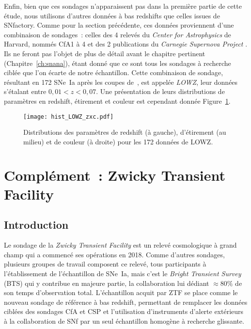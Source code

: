 \documentclass[../main/main.tex]{subfiles}
\begin{document}
Enfin, bien que ces sondages n'apparaissent pas dans la première partie de cette
étude, nous utilisons d'autres données à bas redshifts que celles issues de
SNfactory. Comme pour la section précédente, ces données proviennent d'une
combinaison de sondages~: celles des 4 relevés du \textit{Center for
Astrophysics} de Harvard, nommés CfA1 à 4 \citep{riess1999, jha2006,
hicken2009a, hicken2009b, hicken2012} et des 2 publications du \textit{Carnegie
Supernova Project} \citep[CSP,][]{contreras2010, folatelli2010,
stritzinger2011}. Ils ne feront pas l'objet de plus de détail avant le chapitre
pertinent (Chapitre~\ref{ch:snana}), étant donné que ce sont tous les sondages à
recherche ciblée que l'on écarte de notre échantillon. Cette combinaison de
sondage, résultant en 172 SNe~Ia après les coupes de~\cite{scolnic2018}, est
appelée \textit{LOWZ}, leur données s'étalant entre $0,01 < z < 0,07$. Une
présentation de leurs distributions de paramètres en redshift, étirement et
couleur est cependant donnée Figure~\ref{fig:lowzhist}.

\begin{figure}[ht]
    \centering
    \texttt{[image: hist\_LOWZ\_zxc.pdf]}
    \caption[Distributions des paramètres de redshift, étirement et couleur de
    LOWZ]{Distributions des paramètres de redshift (à gauche), d'étirement (au
    milieu) et de couleur (à droite) pour les 172 données de LOWZ.}
    \label{fig:lowzhist}
\end{figure}

\section{Complément~: Zwicky Transient Facility}\label{sec:ztf}
\subsection{Introduction}\label{ssec:ztfintro}

Le sondage de la \textit{Zwicky Transient Facility} \citep[ZTF,][]{bellm2019,
dekany2020} est un relevé cosmologique à grand champ qui a commencé ses
opérations en 2018. Comme d'autres sondages, plusieurs groupes de travail
composent ce relevé, tous participants à l'établissement de l'échantillon de
SNe~Ia, mais c'est le \textit{Bright Transient Survey} (BTS) qui y contribue en
majeure partie, la collaboration lui dédiant $\approx 80\%$ de son temps
d'observation total. L'échantillon acquit par ZTF se place comme le nouveau
sondage de référence à bas redshift, permettant de remplacer les données ciblées
des sondages CfA et CSP et l'utilisation d'instruments d'alerte extérieurs à la
collaboration de SNf par un seul échantillon homogène à recherche glissante.
\end{document}
